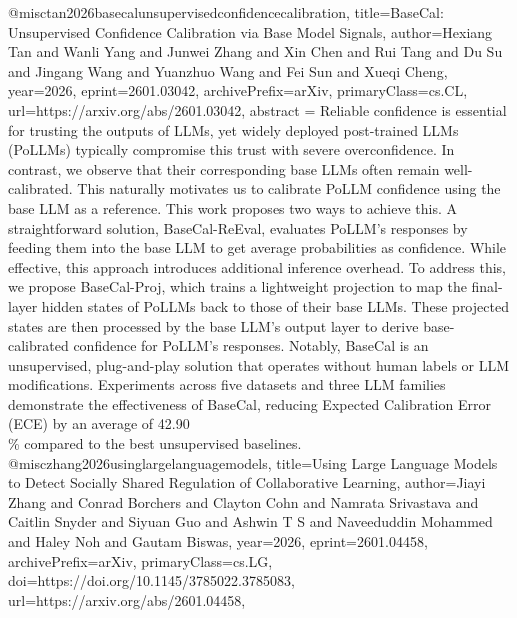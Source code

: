{}@misc{tan2026basecalunsupervisedconfidencecalibration,
      title={BaseCal: Unsupervised Confidence Calibration via Base Model Signals}, 
      author={Hexiang Tan and Wanli Yang and Junwei Zhang and Xin Chen and Rui Tang and Du Su and Jingang Wang and Yuanzhuo Wang and Fei Sun and Xueqi Cheng},
      year={2026},
      eprint={2601.03042},
      archivePrefix={arXiv},
      primaryClass={cs.CL},
      url={https://arxiv.org/abs/2601.03042},
      abstract = {Reliable confidence is essential for trusting the outputs of LLMs, yet widely deployed post-trained LLMs (PoLLMs) typically compromise this trust with severe overconfidence. In contrast, we observe that their corresponding base LLMs often remain well-calibrated. This naturally motivates us to calibrate PoLLM confidence using the base LLM as a reference. This work proposes two ways to achieve this. A straightforward solution, BaseCal-ReEval, evaluates PoLLM's responses by feeding them into the base LLM to get average probabilities as confidence. While effective, this approach introduces additional inference overhead. To address this, we propose BaseCal-Proj, which trains a lightweight projection to map the final-layer hidden states of PoLLMs back to those of their base LLMs. These projected states are then processed by the base LLM's output layer to derive base-calibrated confidence for PoLLM's responses. Notably, BaseCal is an unsupervised, plug-and-play solution that operates without human labels or LLM modifications. Experiments across five datasets and three LLM families demonstrate the effectiveness of BaseCal, reducing Expected Calibration Error (ECE) by an average of 42.90\\\% compared to the best unsupervised baselines.}
}@misc{zhang2026usinglargelanguagemodels,
      title={Using Large Language Models to Detect Socially Shared Regulation of Collaborative Learning}, 
      author={Jiayi Zhang and Conrad Borchers and Clayton Cohn and Namrata Srivastava and Caitlin Snyder and Siyuan Guo and Ashwin T S and Naveeduddin Mohammed and Haley Noh and Gautam Biswas},
      year={2026},
      eprint={2601.04458},
      archivePrefix={arXiv},
      primaryClass={cs.LG},
      doi={https://doi.org/10.1145/3785022.3785083},
      url={https://arxiv.org/abs/2601.04458},
}
